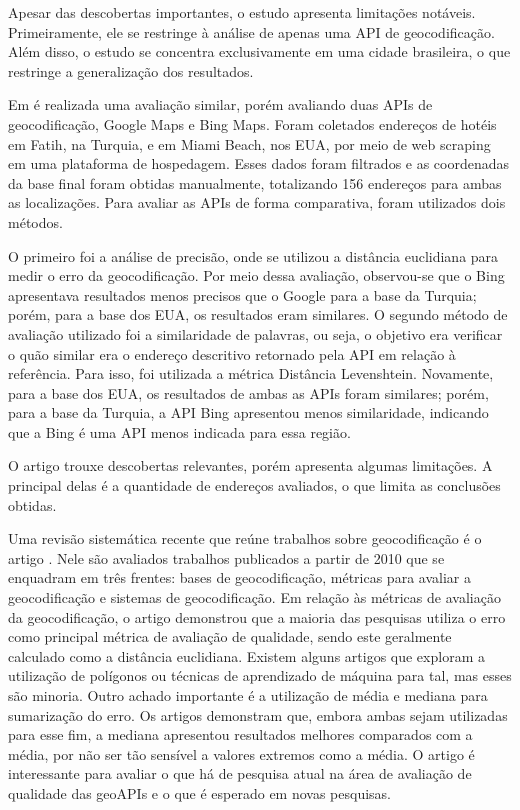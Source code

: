 Apesar das descobertas importantes, o estudo apresenta limitações notáveis. Primeiramente, ele se restringe à análise de apenas uma API de geocodificação. Além disso, o estudo se concentra exclusivamente em uma cidade brasileira, o que restringe a generalização dos resultados. 

Em \cite{kilic2020} é realizada uma avaliação similar, porém avaliando duas APIs de geocodificação, Google Maps e Bing Maps. Foram coletados endereços de hotéis em Fatih, na Turquia, e em Miami Beach, nos EUA, por meio de web scraping em uma plataforma de hospedagem. Esses dados foram filtrados e as coordenadas da base final foram obtidas manualmente, totalizando 156 endereços para ambas as localizações. Para avaliar as APIs de forma comparativa, foram utilizados dois métodos.

O primeiro foi a análise de precisão, onde se utilizou a distância euclidiana para medir o erro da geocodificação. Por meio dessa avaliação, observou-se que o Bing apresentava resultados menos precisos que o Google para a base da Turquia; porém, para a base dos EUA, os resultados eram similares. O segundo método de avaliação utilizado foi a similaridade de palavras, ou seja, o objetivo era verificar o quão similar era o endereço descritivo retornado pela API em relação à referência. Para isso, foi utilizada a métrica Distância Levenshtein. Novamente, para a base dos EUA, os resultados de ambas as APIs foram similares; porém, para a base da Turquia, a API Bing apresentou menos similaridade, indicando que a Bing é uma API menos indicada para essa região.

O artigo trouxe descobertas relevantes, porém apresenta algumas limitações. A principal delas é a quantidade de endereços avaliados, o que limita as conclusões obtidas.

Uma revisão sistemática recente que reúne trabalhos sobre geocodificação é o artigo \cite{zhang2024}. Nele são avaliados trabalhos publicados a partir de 2010 que se enquadram em três frentes: bases de geocodificação, métricas para avaliar a geocodificação e sistemas de geocodificação. Em relação às métricas de avaliação da geocodificação, o artigo demonstrou que a maioria das pesquisas utiliza o erro como principal métrica de avaliação de qualidade, sendo este geralmente calculado como a distância euclidiana. Existem alguns artigos que exploram a utilização de polígonos ou técnicas de aprendizado de máquina para tal, mas esses são minoria. Outro achado importante é a utilização de média e mediana para sumarização do erro. Os artigos demonstram que, embora ambas sejam utilizadas para esse fim, a mediana apresentou resultados melhores comparados com a média, por não ser tão sensível a valores extremos como a média. O artigo é interessante para avaliar o que há de pesquisa atual na área de avaliação de qualidade das geoAPIs e o que é esperado em novas pesquisas.

